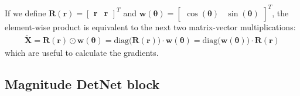 If we define $\bm R(\bm{r})= \begin{bmatrix}\bm{r}&\bm r\end{bmatrix}^T$ and $\bm w(\bm\theta)=\begin{bmatrix}\cos(\bm{\theta})&\sin(\bm{\theta})\end{bmatrix}^T$, the element-wise product is equivalent to the next two matrix-vector multiplications:
\begin{align}
	\bm\tilde{X}=\bm R(\bm{r})\odot\bm w(\bm\theta)
	=\text{diag}\bigl(\bm R(\bm{r})\bigr)\cdot \bm w(\bm\theta)
	=\text{diag}\bigl(\bm w(\bm\theta)\bigr)\cdot\bm R(\bm{r})
\end{align}
which are useful to calculate the gradients.

\subsection{Magnitude DetNet block}

